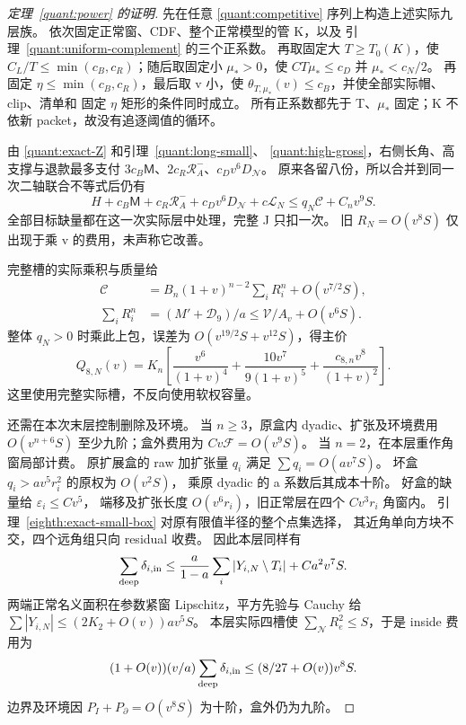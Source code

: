 \begin{proof}[定理~\ref{quant:power} 的证明]
先在任意 \eqref{quant:competitive} 序列上构造上述实际九层族。
依次固定正常窗、CDF、整个正常模型的管 K，以及
引理~\ref{quant:uniform-complement} 的三个正系数。
再取固定大 \(T\ge T_0(K)\)，使
\(C_L/T\le\min(c_B,c_R)\)；随后取固定小 \(\mu_*>0\)，使
\(CT\mu_*\le c_D\) 并 \(\mu_*<c_N/2\)。
再固定 \(\eta\le\min(c_B,c_R)\)，最后取 v 小，使
\(\theta_{T,\mu_*}(v)\le c_B\)，并使全部实际帽、clip、清单和
固定 \(\eta\) 矩形的条件同时成立。
所有正系数都先于 T、\(\mu_*\) 固定；K 不依新 packet，故没有追逐阈值的循环。

由 \eqref{quant:exact-Z} 和引理~\ref{quant:long-small}、
\ref{quant:high-gross}，右侧长角、高支撑与退款最多支付
\(3c_B\mathsf M\)、\(2c_R\mathcal R_A^-\)、\(c_Dv^6D_{\mathcal N}\)。
原来各留八份，所以合并到同一次二轴联合不等式后仍有
\begin{equation}\label{quant:complete-price}
 H+c_B\mathsf M+c_R\mathcal R_A^-+c_Dv^6D_{\mathcal N}
       +c\mathcal L_N
 \le q_N\mathcal C+C_nv^9S.
\end{equation}
全部目标缺量都在这一次实际层中处理，完整 J 只扣一次。
旧 \(R_N=O(v^8S)\) 仅出现于乘 v 的费用，未声称它改善。

完整槽的实际乘积与质量给
\[
 \begin{aligned}
 \mathcal C&=B_n(1+v)^{n-2}\sum_iR_i^n+O(v^{7/2}S),\\
 \sum_iR_i^n&=(M'+\mathcal D_9)/a
                    \le\mathcal V/A_v+O(v^6S).
 \end{aligned}
\]
整体 \(q_N>0\) 时乘此上包，误差为
\(O(v^{19/2}S+v^{12}S)\)，得主价
\[
 Q_{8,N}(v)=K_n\left[
  \frac{v^6}{(1+v)^4}
  +\frac{10v^7}{9(1+v)^5}
  +\frac{c_{8,n}v^8}{(1+v)^2}\right].
\]
这里使用完整实际槽，不反向使用软权容量。

还需在本次末层控制删除及环境。
当 \(n\ge3\)，原盒内 dyadic、扩张及环境费用
\(O(v^{n+6}S)\) 至少九阶；盒外费用为
\(Cv\mathcal F=O(v^9S)\)。
当 \(n=2\)，在本层重作角窗局部计费。
原扩展盒的 raw 加扩张量 \(q_i\) 满足
\(\sum q_i=O(av^7S)\)。
坏盒 \(q_i>av^5r_i^2\) 的原权为 \(O(v^2S)\)，
乘原 dyadic 的 a 系数后其成本十阶。
好盒的缺量给 \(\varepsilon_i\le Cv^5\)，
端移及扩张长度 \(O(v^6r_i)\)，旧正常层在四个
\(Cv^3r_i\) 角窗内。
引理~\ref{eighth:exact-small-box} 对原有限值半径的整个点集选择，
其近角单向方块不交，四个远角组只向 residual 收费。
因此本层同样有
\[
 \sum_{\rm deep}\delta_{i,\rm in}
 \le\frac a{1-a}\sum_i|Y_{i,N}\setminus T_i|+Ca^2v^7S.
\]
两端正常名义面积在参数紧窗 Lipschitz，平方先验与 Cauchy 给
\(\sum|Y_{i,N}|\le(2K_2+O(v))av^5S\)。
本层实际四槽使 \(\sum_{\mathcal N}R_e^2\le S\)，于是 inside 费用为
\[
 (1+O(v))(v/a)\sum_{\rm deep}\delta_{i,\rm in}
       \le(8/27+O(v))v^8S.
\]
边界及环境因 \(P_I+P_\partial=O(v^8S)\) 为十阶，盒外仍为九阶。


\end{proof}
